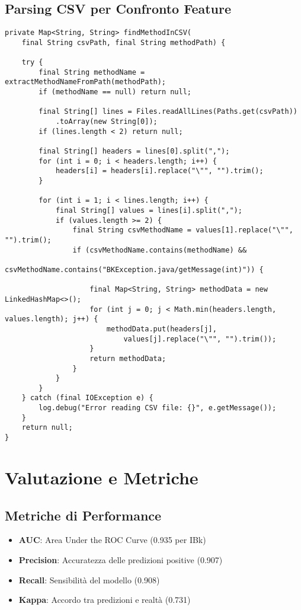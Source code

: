 \documentclass[12pt,a4paper]{article}
\begin{document}
\subsection{Parsing CSV per Confronto Feature}

\begin{lstlisting}[caption=Parsing CSV per accesso completo alle feature]
private Map<String, String> findMethodInCSV(
    final String csvPath, final String methodPath) {
    
    try {
        final String methodName = extractMethodNameFromPath(methodPath);
        if (methodName == null) return null;

        final String[] lines = Files.readAllLines(Paths.get(csvPath))
            .toArray(new String[0]);
        if (lines.length < 2) return null;

        final String[] headers = lines[0].split(",");
        for (int i = 0; i < headers.length; i++) {
            headers[i] = headers[i].replace("\"", "").trim();
        }

        for (int i = 1; i < lines.length; i++) {
            final String[] values = lines[i].split(",");
            if (values.length >= 2) {
                final String csvMethodName = values[1].replace("\"", "").trim();
                if (csvMethodName.contains(methodName) && 
                    csvMethodName.contains("BKException.java/getMessage(int)")) {
                    
                    final Map<String, String> methodData = new LinkedHashMap<>();
                    for (int j = 0; j < Math.min(headers.length, values.length); j++) {
                        methodData.put(headers[j], 
                            values[j].replace("\"", "").trim());
                    }
                    return methodData;
                }
            }
        }
    } catch (final IOException e) {
        log.debug("Error reading CSV file: {}", e.getMessage());
    }
    return null;
}
\end{lstlisting}

\section{Valutazione e Metriche}

\subsection{Metriche di Performance}

\begin{itemize}
    \item \textbf{AUC}: Area Under the ROC Curve (0.935 per IBk)
    \item \textbf{Precision}: Accuratezza delle predizioni positive (0.907)
    \item \textbf{Recall}: Sensibilità del modello (0.908)
    \item \textbf{Kappa}: Accordo tra predizioni e realtà (0.731)
\end{itemize}
\end{document}
